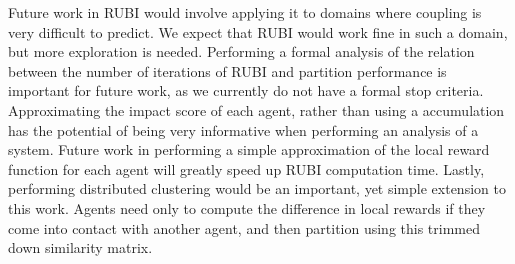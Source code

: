 \documentclass[letterpaper]{article}
\begin{document}
Future work in RUBI would involve applying it to domains where coupling is very difficult to predict. We expect that RUBI would work fine in such a domain, but more exploration is needed. Performing a formal analysis of the relation between the number of iterations of RUBI and partition performance is important for future work, as we currently do not have a formal stop criteria. Approximating the impact score of each agent, rather than using a accumulation has the potential of being very informative when performing an analysis of a system. Future work in performing a simple approximation of the local reward function for each agent will greatly speed up RUBI computation time. Lastly, performing distributed clustering would be an important, yet simple extension to this work. Agents need only to compute the difference in local rewards if they come into contact with another agent, and then partition using this trimmed down similarity matrix. 
\label{sec:CONCLUSION}




\end{document}

